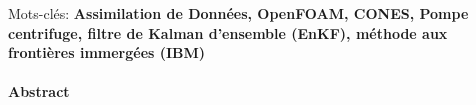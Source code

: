 Mots-clés: \textbf{Assimilation de Données, OpenFOAM, CONES, Pompe centrifuge, filtre de Kalman d'ensemble (EnKF), méthode aux frontières immergées (IBM)}

\paragraph{Abstract}
\vspace{0,5cm}


